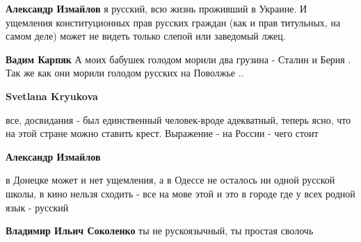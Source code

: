 \begin{itemize}
\begin{itemize}
 
\textbf{Александр Измайлов} я русский, всю жизнь проживший в Украине. И ущемления конституционных прав русских граждан (как и прав титульных, на самом деле) может не видеть только слепой или заведомый лжец.

 
\textbf{Вадим Карпяк} А моих бабушек голодом морили два грузина - Сталин и Берия . Так же как они морили голодом русских на Поволжье ..

 
\textbf{Svetlana Kryukova} 

все, досвидания - был единственный человек-вроде адекватный, теперь ясно, что на
этой стране можно ставить крест. Выражение - на России - чего стоит


 
\textbf{Александр Измайлов} 

в Донецке может и нет ущемления, а в Одессе не осталось ни одной русской школы,
в кино нельзя сходить - все на мове этой и это в городе где у всех родной язык - русский


 
\textbf{Владимир Ильич Соколенко} ты не рускоязычный, ты простая сволочь

 


\end{itemize}
\end{itemize}
